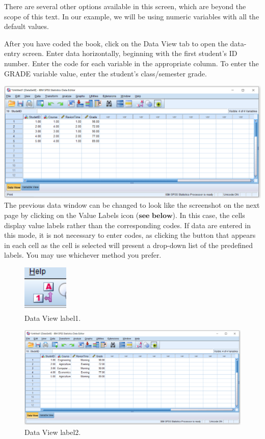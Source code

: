 \documentclass[
]{book}
\begin{document}
There are several other options available in this screen, which are beyond the scope of this text. In our example, we will be using numeric variables with all the default values.

After you have coded the book, click on the Data View tab to open the data-entry screen. Enter data horizontally, beginning with the first student's ID number. Enter the code for each variable in the appropriate column. To enter the GRADE variable value, enter the student's class/semester grade.

\includegraphics{dataview.png}
The previous data window can be changed to look like the screenshot on the next page by clicking on the Value Labels icon (\(\textbf{see below}\)). In this case, the cells display value labels rather than the corresponding codes. If data are entered in this mode, it is not necessary to enter codes, as clicking the button that appears in each cell as the cell is selected will present a drop-down list of the predefined labels. You may use whichever method you prefer.

\begin{figure}
\centering
\includegraphics{valuelabels.png}
\caption{Data View label1.}
\end{figure}

\begin{figure}
\centering
\includegraphics{Valuelabels2.png}
\caption{Data View label2.}
\end{figure}
\end{document}
